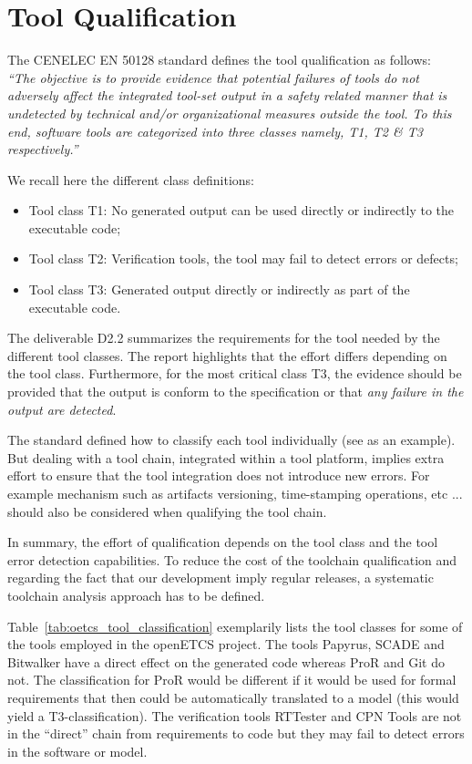 \section{Tool Qualification}
\label{sec-1-1}


The CENELEC EN 50128 standard \cite{standard_railway_2011} defines the tool
qualification as follows:\\
{\it ``The objective is to provide evidence that potential
failures of tools do not adversely affect the integrated tool-set output in a
safety related manner that is undetected by technical and/or organizational
measures outside the tool. To this end, software tools are categorized into
three classes namely, T1, T2 \& T3 respectively.''}

We recall here the different class definitions:
\begin{itemize}
\item Tool class T1: No generated output can be used directly or indirectly to the
  executable code;
\item Tool class T2: Verification tools, the tool may fail to detect errors or
  defects;
\item Tool class T3: Generated output directly or indirectly  as part of the
  executable code.
\end{itemize}
The deliverable D2.2 \cite{pokam_report_2013} summarizes the requirements for the
tool needed by the different tool classes. The report highlights that the
effort differs depending on the tool class. Furthermore, for
the most critical class T3,  the evidence should be provided that the output is
conform to the specification or that \emph{any failure in the output
  are detected}. 

The standard defined how to classify each tool individually (see
\cite{nielsen_efficient_2012,huang_test_2013} as an example).  But dealing with a tool
chain, integrated within a tool platform, implies extra effort to
ensure that the tool integration does not introduce new errors. For
example mechanism such as artifacts versioning, time-stamping
operations, etc ... should also be considered when qualifying the tool
chain.

In summary, the effort of qualification depends on the tool class and the tool
error detection capabilities. To reduce the cost of the toolchain qualification
and regarding the fact that our development imply regular releases, a systematic
toolchain analysis approach has to be defined.

Table~\ref{tab:oetcs_tool_classification} exemplarily lists the tool classes for some of the tools employed in the openETCS project. The tools Papyrus, SCADE and Bitwalker have a direct effect on the generated code whereas ProR and Git do not. The classification for ProR would be different if it would be used for formal requirements that then could be automatically translated to a model (this would yield a T3-classification). The verification tools RTTester and CPN Tools are not in the ``direct'' chain from requirements to code but they may fail to detect errors in the software or model.

